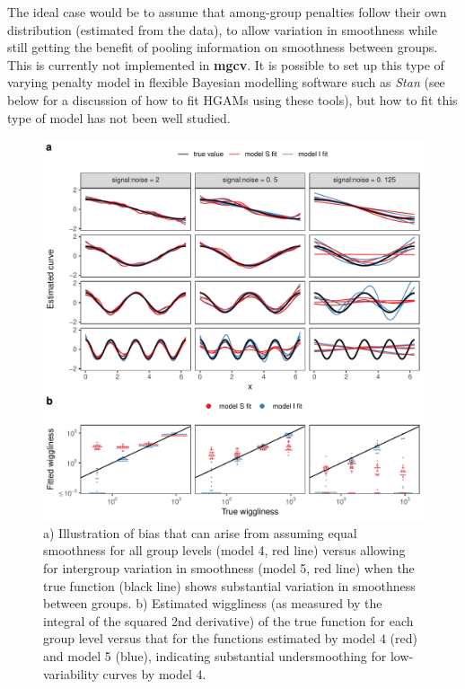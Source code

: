\documentclass[12pt]{article}
\begin{document}
The ideal case would be to assume that among-group penalties follow
their own distribution (estimated from the data), to allow variation in
smoothness while still getting the benefit of pooling information on
smoothness between groups. This is currently not implemented in
\textbf{mgcv}. It is possible to set up this type of varying penalty
model in flexible Bayesian modelling software such as \emph{Stan} (see
below for a discussion of how to fit HGAMs using these tools), but how
to fit this type of model has not been well studied.

\begin{figure}
\centering
\includegraphics{../figures/single_smooth_bias_plot-1.pdf}
\caption{\label{fig:var_pen} a) Illustration of bias that can arise from
assuming equal smoothness for all group levels (model 4, red line)
versus allowing for intergroup variation in smoothness (model 5, red
line) when the true function (black line) shows substantial variation in
smoothness between groups. b) Estimated wiggliness (as measured by the
integral of the squared 2nd derivative) of the true function for each
group level versus that for the functions estimated by model 4 (red) and
model 5 (blue), indicating substantial undersmoothing for
low-variability curves by model 4.}
\end{figure}
\end{document}
